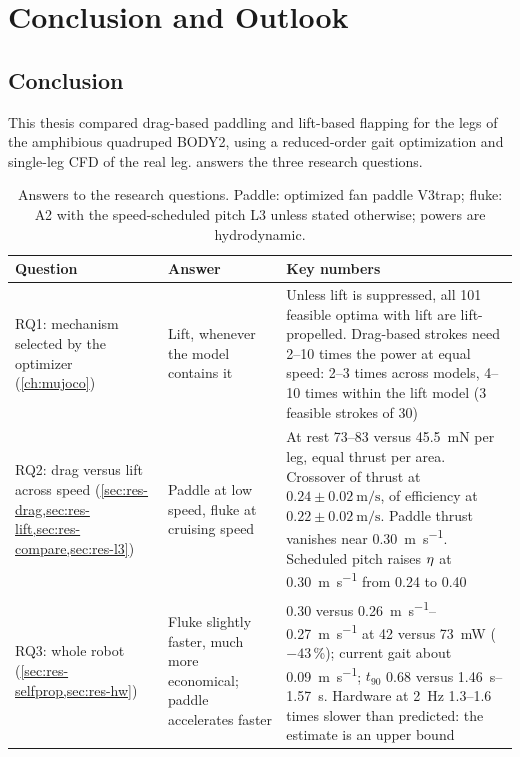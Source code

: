 \chapter{Conclusion and Outlook}
\label{ch:conclusion}

\section{Conclusion}

This thesis compared drag-based paddling and lift-based flapping for the legs of the amphibious quadruped BODY2,
using a reduced-order gait optimization and single-leg CFD of the real leg.  answers the three
research questions.

\begin{table}[H]
  \centering
  \caption[Key findings]{Answers to the research questions. Paddle: optimized fan paddle V3trap; fluke: A2 with the speed-scheduled
    pitch L3 unless stated otherwise; powers are hydrodynamic.}
  \label{tab:key-findings}
  \small
  \begin{tabularx}{\textwidth}{@{}>{\raggedright\arraybackslash}p{27mm}>{\raggedright\arraybackslash}p{40mm}>{\raggedright\arraybackslash}X@{}}
    \toprule
    Question & Answer & Key numbers \\
    \midrule
    RQ1: mechanism selected by the optimizer (\cref{ch:mujoco}) &
      Lift, whenever the model contains it &
      Unless lift is suppressed, all 101 feasible optima with lift are lift-propelled. Drag-based strokes need 2--10 times the power at equal speed:
      2--3 times across models, 4--10 times within the lift model (3 feasible strokes of 30) \\
    \addlinespace
    RQ2: drag versus lift across speed (\cref{sec:res-drag,sec:res-lift,sec:res-compare,sec:res-l3}) &
      Paddle at low speed, fluke at cruising speed &
      At rest \SIrange{73}{83}{} versus \SI{45.5}{\milli\newton} per leg, equal thrust per area. Crossover of thrust at
      $0.24\pm\SI{0.02}{\metre\per\second}$, of efficiency at $0.22\pm\SI{0.02}{\metre\per\second}$. Paddle thrust vanishes near
      \SI{0.30}{\metre\per\second}. Scheduled pitch raises $\eta$ at \SI{0.30}{\metre\per\second} from 0.24 to 0.40 \\
    \addlinespace
    RQ3: whole robot (\cref{sec:res-selfprop,sec:res-hw}) &
      Fluke slightly faster, much more economical; paddle accelerates faster &
      \SI{0.30}{} versus \SIrange{0.26}{0.27}{\metre\per\second} at \SI{42}{} versus \SI{73}{\milli\watt} ($-43$\,\%); current gait
      about \SI{0.09}{\metre\per\second}; $t_{90}$ \SI{0.68}{} versus \SIrange{1.46}{1.57}{\second}. Hardware at \SI{2}{\hertz}
      1.3--1.6 times slower than predicted: the estimate is an upper bound \\
    \bottomrule
  \end{tabularx}
\end{table}

